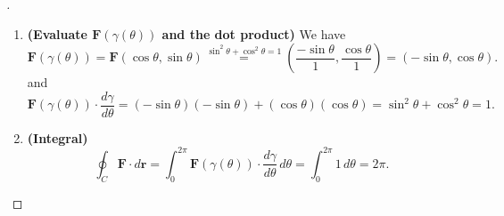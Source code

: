 \documentclass[11pt,openany]{article}
\renewcommand{\vec}[1]{\mathbf{#1}}
\begin{document}
\begin{proof}[\sol]
\begin{enumerate}
\begin{center}
\begin{minipage}{.4\textwidth}
\begin{tikzpicture}[scale=.8]
	\end{tikzpicture}
	\end{minipage}
	\end{center}
	\item \textbf{(Evaluate $\textbf{F}(\gamma(\theta))$ and the dot product)}\; We have \[
	\vec{F}(\gamma(\theta)) = \vec{F}(\cos\theta,\sin\theta) \overset{\sin^2\theta+\cos^2\theta=1}{=} \left( \frac{-\sin \theta}{1}, \frac{\cos \theta}{1} \right)
	= (-\sin \theta, \cos \theta).
	\] and \[
	\vec{F}(\gamma(\theta)) \cdot \frac{d\gamma}{d\theta}
	= (-\sin \theta)(-\sin \theta) + (\cos \theta)(\cos \theta)
	= \sin^2 \theta + \cos^2 \theta = 1.
	\]
	\item \textbf{(Integral)} \[
	\oint_C \vec{F} \cdot d\vec{r}
	= \int_0^{2\pi} \vec{F}(\gamma(\theta)) \cdot\frac{d\gamma}{d\theta}\,d\theta
	= \int_0^{2\pi} 1\,d\theta = 2\pi.
	\]
\end{enumerate}
\end{proof}

\newpage
\end{document}
